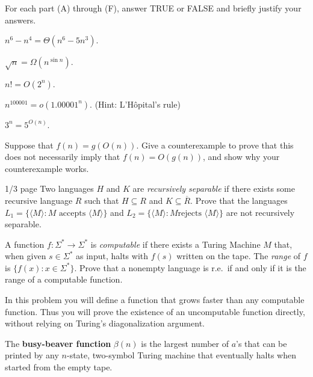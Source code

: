 \documentclass[solution, letterpaper]{cscie121}
\begin{document}



For each part (A) through (F), answer TRUE or FALSE and briefly justify your answers.

\subproblem $n^6 - n^4 = \Theta(n^6 - 5n^3)$.

\subproblem $\sqrt{n} = \Omega(n^{\sin{n}})$.

\subproblem $n! = O(2^n)$.

\subproblem $n^{100001}=o(1.00001^n)$. (Hint: L'H\^opital's rule)

\subproblem $3^n=5^{O(n)}$.

\subproblem Suppose that $f(n) = g(O(n))$. Give a counterexample to prove that this does not necessarily imply that $f(n) = O(g(n))$, and show why your counterexample works.


\begin{solution}
\end{solution}


 {1/3 page}
Two languages $H$ and $K$ are \emph{recursively separable} if there
exists some recursive language $R$ such that $H \subseteq R$ and
$K \subseteq \overline{R}$.  Prove that the languages $L_1 =
\{\langle M \rangle : M  \mbox{ accepts } \langle M \rangle\}$ and
$L_2 = \{\langle M \rangle: M \mbox{
rejects } \langle M \rangle \}$ are not recursively separable.

\begin{solution}
\end{solution}

A function $f:\Sigma^* \rightarrow \Sigma^*$ is {\it computable} if
there exists a Turing Machine $M$ that, when given $s \in \Sigma^*$ as input,
halts with $f(s)$ written on the tape. The \emph{range} of $f$ is $\{f(x):
  x \in \Sigma^*\}$. Prove that a nonempty language is r.e.~if and only if 
  it is the range of a computable function. 

\begin{solution}
\end{solution}

In this problem you will define a function that grows faster than any computable function. Thus you will prove the existence of an uncomputable function directly, without relying on Turing's diagonalization argument. 

The {\bf busy-beaver function}
$\beta(n)$ is
the largest number of $a$'s that can be printed by any $n$-state, two-symbol Turing machine that eventually halts when started from the empty tape.
\end{document}
